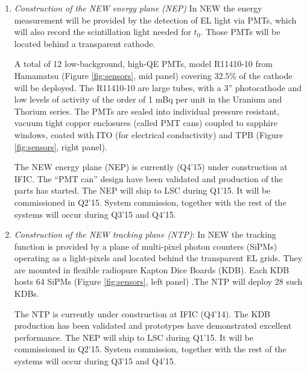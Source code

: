 \begin{enumerate}
\item {\em Construction of the NEW energy plane (NEP)}
In NEW the energy measurement will be provided by the detection of EL light via PMTs, which will also record the scintillation light needed for $t_0$. Those PMTs will be located behind a transparent cathode.

A total of 12 low-background, high-QE PMTs, model R11410-10 from Hamamatsu (Figure  \ref{fig:sensors}, mid panel) covering 32.5\% of the cathode will be deployed. The R11410-10 are large tubes, with a 3'' photocathode and low levels of  activity of the order of 1 mBq per unit in the Uranium and Thorium series. The PMTs are sealed into individual pressure resistant, vacuum tight copper enclosures (called PMT cans) coupled to 
sapphire windows, coated with ITO (for electrical conductivity) and TPB (Figure  \ref{fig:sensors}, right panel).

The NEW energy plane (NEP) is currently (Q4'15) under construction at IFIC. The ``PMT can'' design have been validated and production of the parts has started. The NEP will ship to LSC during Q1'15. It will be commissioned in Q2'15. System commission, together with the rest of the systems will occur during Q3'15 and Q4'15.

\item  {\em  Construction of the NEW tracking plane (NTP)}:
In NEW the tracking function is provided by a plane of multi-pixel photon counters (SiPMs) operating as a light-pixels and located behind the transparent EL grids. They are mounted in flexible radiopure Kapton Dice Boards (KDB). Each KDB hosts 64 SiPMs (Figure  \ref{fig:sensors}, left panel) .The NTP will deploy 28 such KDBs. 

The NTP is currently under construction at IFIC (Q4'14). The KDB production has been validated and prototypes have demonstrated excellent performance. The NEP will ship to LSC during Q1'15. It will be commissioned in Q2'15. System commission, together with the rest of the systems will occur during Q3'15 and Q4'15. 

\end{enumerate}
 

